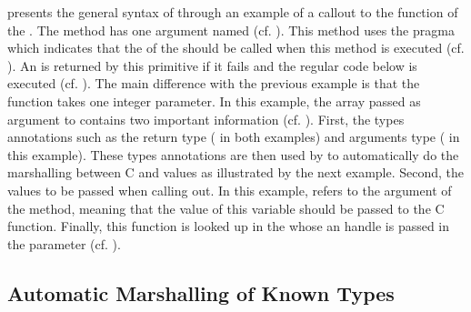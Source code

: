  presents the general syntax of \NBFFI through an example of a callout to the  function of the .
The  method has one argument named  (cf. ).
This method uses the pragma  which indicates that the  of the  should be called when this method is executed (cf. ).
An  is returned by this primitive if it fails and the regular \PH code below is executed (cf. ).
The main difference with the previous example is that the  function takes one integer parameter.
In this example, the array  passed as argument to  contains two important information (cf. ).
First, the types annotations such as the return type ( in both examples) and arguments type ( in this example).
These types annotations are then used by \NBFFI to automatically do the marshalling between C and \PH values as illustrated by the next example.
Second, the values to be passed when calling out.
In this example,  refers to the argument of the  method, meaning that the value of this variable should be passed to the  C function.
Finally, this  function is looked up in the  whose an handle is passed in the  parameter (cf. ).

\subsection{Automatic Marshalling of Known Types}

